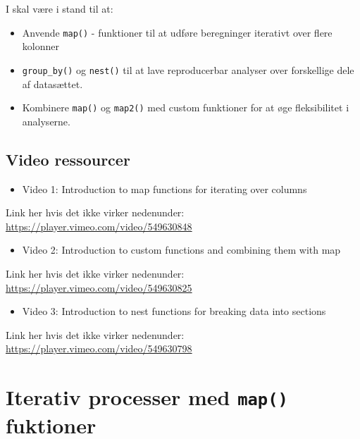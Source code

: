 \documentclass[
]{book}
\providecommand{\tightlist}{%
  \setlength{\itemsep}{0pt}\setlength{\parskip}{0pt}}
\begin{document}
I skal være i stand til at:

\begin{itemize}
\tightlist
\item
  Anvende \texttt{map()} - funktioner til at udføre beregninger iterativt over flere kolonner
\item
  \texttt{group\_by()} og \texttt{nest()} til at lave reproducerbar analyser over forskellige dele af datasættet.
\item
  Kombinere \texttt{map()} og \texttt{map2()} med custom funktioner for at øge fleksibilitet i analyserne.
\end{itemize}

\hypertarget{video-ressourcer-3}{%
\subsection{Video ressourcer}\label{video-ressourcer-3}}

\begin{itemize}
\tightlist
\item
  Video 1: Introduction to map functions for iterating over columns
\end{itemize}

Link her hvis det ikke virker nedenunder: \url{https://player.vimeo.com/video/549630848}

\begin{itemize}
\tightlist
\item
  Video 2: Introduction to custom functions and combining them with map
\end{itemize}

Link her hvis det ikke virker nedenunder: \url{https://player.vimeo.com/video/549630825}

\begin{itemize}
\tightlist
\item
  Video 3: Introduction to nest functions for breaking data into sections
\end{itemize}

Link her hvis det ikke virker nedenunder: \url{https://player.vimeo.com/video/549630798}

\hypertarget{iterativ-processer-med-map-fuktioner}{%
\section{\texorpdfstring{Iterativ processer med \texttt{map()} fuktioner}{Iterativ processer med map() fuktioner}}\label{iterativ-processer-med-map-fuktioner}}
\end{document}
